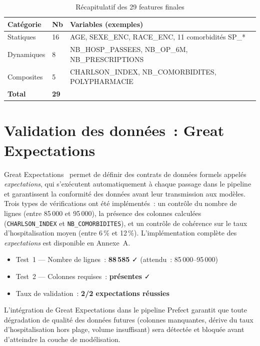 \begin{table}[htbp]
\centering
\caption{Récapitulatif des 29 features finales}
\label{tab:features}
\begin{tabular}{@{}lll@{}}
\toprule
\textbf{Catégorie} & \textbf{Nb} & \textbf{Variables (exemples)} \\
\midrule
Statiques    & 16 & AGE, SEXE\_ENC, RACE\_ENC, 11 comorbidités SP\_* \\
Dynamiques   &  8 & NB\_HOSP\_PASSEES, NB\_OP\_6M, NB\_PRESCRIPTIONS \\
Composites   &  5 & CHARLSON\_INDEX, NB\_COMORBIDITES, POLYPHARMACIE \\
\midrule
\textbf{Total} & \textbf{29} & \\
\bottomrule
\end{tabular}
\end{table}

\section{Validation des données~: Great Expectations}

Great Expectations~\cite{gormley2020great} permet de définir des contrats de données
formels appelés \textit{expectations}, qui s'exécutent automatiquement à chaque passage
dans le pipeline et garantissent la conformité des données avant leur transmission aux
modèles. Trois types de vérifications ont été implémentés~: un contrôle du nombre de
lignes (entre 85\,000 et 95\,000), la présence des colonnes calculées
(\texttt{CHARLSON\_INDEX} et \texttt{NB\_COMORBIDITES}), et un contrôle de cohérence
sur le taux d'hospitalisation moyen (entre 6\,\% et 12\,\%). L'implémentation complète
des \textit{expectations} est disponible en Annexe~A.

\begin{resultatbox}
\begin{itemize}
  \item Test~1 — Nombre de lignes~: \textbf{88\,585} ✓ (attendu~: 85\,000--95\,000)
  \item Test~2 — Colonnes requises~: \textbf{présentes} ✓
  \item Taux de validation~: \textbf{2/2 expectations réussies}
\end{itemize}
\end{resultatbox}

L'intégration de Great Expectations dans le pipeline Prefect garantit que toute
dégradation de qualité des données futures (colonnes manquantes, dérive du taux
d'hospitalisation hors plage, volume insuffisant) sera détectée et bloquée avant
d'atteindre la couche de modélisation.

